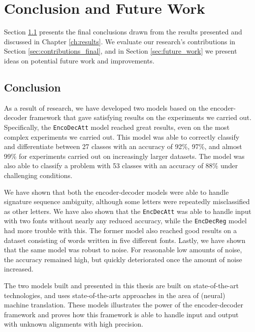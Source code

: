 
\chapter{Conclusion and Future Work}
\label{ch:conclusion}
Section \ref{sec:conclusion} presents the final conclusions drawn from the results presented and discussed in Chapter \ref{ch:results}. We evaluate our research's contributions in Section \ref{sec:contributions_final}, and in Section \ref{sec:future_work} we present ideas on potential future work and improvements.

\section{Conclusion}
\label{sec:conclusion}
As a result of research, we have developed two models based on the encoder-decoder framework that gave satisfying results on the experiments we carried out. Specifically, the {\tt EncoDecAtt} model reached great results, even on the most complex experiments we carried out. This model was able to correctly classify and differentiate between 27 classes with an accuracy of 92\%, 97\%, and almost 99\% for experiments carried out on increasingly larger datasets. The model was also able to classify a problem with 53 classes with an accuracy of 88\% under challenging conditions.

We have shown that both the encoder-decoder models were able to handle signature sequence ambiguity, although some letters were repeatedly misclassified as other letters. We have also shown that the {\tt EncDecAtt} was able to handle input with two fonts without nearly any reduced accuracy, while the {\tt EncDecReg} model had more trouble with this. The former model also reached good results on a dataset consisting of words written in five different fonts. Lastly, we have shown that the same model was robust to noise. For reasonable low amounts of noise, the accuracy remained high, but quickly deteriorated once the amount of noise increased.

The two models built and presented in this thesis are built on state-of-the-art technologies, and uses state-of-the-arts approaches in the area of (neural) machine translation. These models illustrates the power of the encoder-decoder framework and proves how this framework is able to handle input and output with unknown alignments with high precision.

